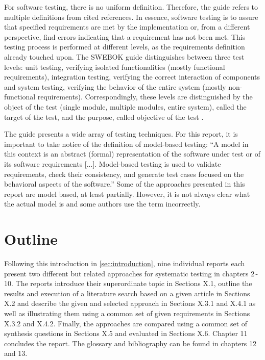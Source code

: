For software testing, there is no uniform definition.
Therefore, the guide refers to multiple definitions from cited references.
In essence, software testing is to assure that specified requirements are met by the implementation or, from a different perspective, find errors indicating that a requirement has not been met.
This testing process is performed at different levels, as the requirements definition already touched upon.
The SWEBOK guide distinguishes between three test levels: unit testing, verifying isolated functionalities (mostly functional requirements), integration testing, verifying the correct interaction of components and system testing, verifying the behavior of the entire system (mostly non-functional requirements).
Correspondingly, these levels are distinguished by the object of the test (single module, multiple modules, entire system), called the target of the test, and the purpose, called objective of the test \cite{SWEBOK}.

The guide presents a wide array of testing techniques.
For this report, it is important to take notice of the definition of model-based testing: \enquote{A model in this context is an abstract (formal) representation of the software under test or of its software requirements [...].
Model-based testing is used to validate requirements, check their consistency, and generate test cases focused on the behavioral aspects of the software.}\cite{SWEBOK}
Some of the approaches presented in this report are model based, at least partially.
However, it is not always clear what the actual model is and some authors use the term incorrectly.

\section{Outline}
\label{sec:intruduction1.3}

Following this introduction in \autoref{sec:introduction}, nine individual reports each present two different but related approaches for systematic testing in chapters 2\,-\,10.
The reports introduce their superordinate topic in Sections X.1, outline the results and execution of a literature search based on a given article in Sections X.2 and describe the given and selected approach in Sections X.3.1 and X.4.1 as well as illustrating them using a common set of given requirements in Sections X.3.2 and X.4.2.
Finally, the approaches are compared using a common set of synthesis questions in Sections X.5 and evaluated in Sections X.6.
Chapter 11 concludes the report.
The glossary and bibliography can be found in chapters 12 and 13.\\


